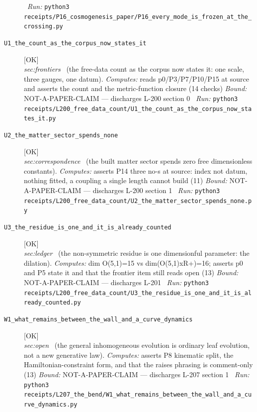 \begin{description}
\ \emph{Run:} \texttt{python3 receipts/P16\_cosmogenesis\_paper/P16\_every\_mode\_is\_frozen\_at\_the\_crossing.py}
\item[\label{rcpt:U1_the_count_as_the_corpus_now_states_it}\texttt{U1\_the\_count\_as\_the\_corpus\_now\_states\_it}]\hfill\textsf{[OK]}\\
\textit{sec:frontiers} \ (the free-data count as the corpus now states it: one scale, three gauges, one datum). 
\emph{Computes:} reads p0/P3/P7/P10/P15 at source and asserts the count and the metric-function closure (14 checks)
 \emph{Bound:} NOT-A-PAPER-CLAIM --- discharges L-200 section 0
\ \emph{Run:} \texttt{python3 receipts/L200\_free\_data\_count/U1\_the\_count\_as\_the\_corpus\_now\_states\_it.py}
\item[\label{rcpt:U2_the_matter_sector_spends_none}\texttt{U2\_the\_matter\_sector\_spends\_none}]\hfill\textsf{[OK]}\\
\textit{sec:correspondence} \ (the built matter sector spends zero free dimensionless constants). 
\emph{Computes:} asserts P14 three no-s at source: index not datum, nothing fitted, a coupling a single length cannot build (11)
 \emph{Bound:} NOT-A-PAPER-CLAIM --- discharges L-200 section 1
\ \emph{Run:} \texttt{python3 receipts/L200\_free\_data\_count/U2\_the\_matter\_sector\_spends\_none.py}
\item[\label{rcpt:U3_the_residue_is_one_and_it_is_already_counted}\texttt{U3\_the\_residue\_is\_one\_and\_it\_is\_already\_counted}]\hfill\textsf{[OK]}\\
\textit{sec:ledger} \ (the non-symmetric residue is one dimensionful parameter: the dilation). 
\emph{Computes:} dim O(5,1)=15 vs dim(O(5,1)xR+)=16; asserts p0 and P5 state it and that the frontier item still reads open (13)
 \emph{Bound:} NOT-A-PAPER-CLAIM --- discharges L-201
\ \emph{Run:} \texttt{python3 receipts/L200\_free\_data\_count/U3\_the\_residue\_is\_one\_and\_it\_is\_already\_counted.py}
\item[\label{rcpt:W1_what_remains_between_the_wall_and_a_curve_dynamics}\texttt{W1\_what\_remains\_between\_the\_wall\_and\_a\_curve\_dynamics}]\hfill\textsf{[OK]}\\
\textit{sec:open} \ (the general inhomogeneous evolution is ordinary leaf evolution, not a new generative law). 
\emph{Computes:} asserts P8 kinematic split, the Hamiltonian-constraint form, and that the raises phrasing is comment-only (13)
 \emph{Bound:} NOT-A-PAPER-CLAIM --- discharges L-207 section 1
\ \emph{Run:} \texttt{python3 receipts/L207\_the\_bend/W1\_what\_remains\_between\_the\_wall\_and\_a\_curve\_dynamics.py}

\end{description}

